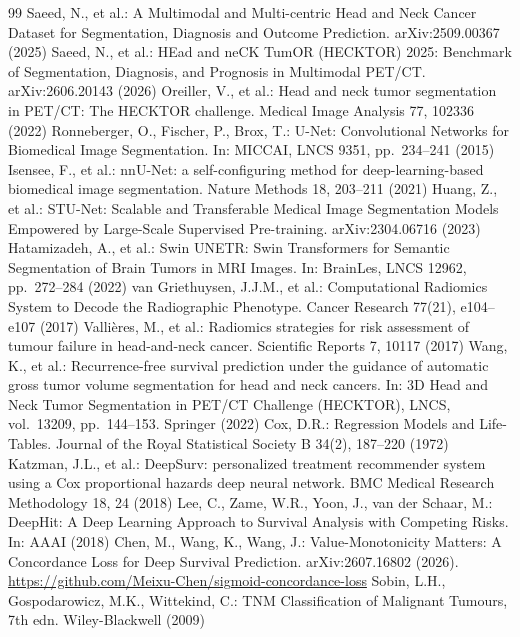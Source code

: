 \documentclass[runningheads]{llncs}
\begin{document}
\begin{thebibliography}{99}
\footnotesize
\linespread{0.85}\selectfont
\setlength{\itemsep}{-1pt}
 Saeed, N., et al.: A Multimodal and Multi-centric Head and Neck Cancer Dataset for Segmentation, Diagnosis and Outcome Prediction. arXiv:2509.00367 (2025)
 Saeed, N., et al.: HEad and neCK TumOR (HECKTOR) 2025: Benchmark of Segmentation, Diagnosis, and Prognosis in Multimodal PET/CT. arXiv:2606.20143 (2026)
 Oreiller, V., et al.: Head and neck tumor segmentation in PET/CT: The HECKTOR challenge. Medical Image Analysis 77, 102336 (2022)
 Ronneberger, O., Fischer, P., Brox, T.: U-Net: Convolutional Networks for Biomedical Image Segmentation. In: MICCAI, LNCS 9351, pp.\ 234--241 (2015)
 Isensee, F., et al.: nnU-Net: a self-configuring method for deep-learning-based biomedical image segmentation. Nature Methods 18, 203--211 (2021)
 Huang, Z., et al.: STU-Net: Scalable and Transferable Medical Image Segmentation Models Empowered by Large-Scale Supervised Pre-training. arXiv:2304.06716 (2023)
 Hatamizadeh, A., et al.: Swin UNETR: Swin Transformers for Semantic Segmentation of Brain Tumors in MRI Images. In: BrainLes, LNCS 12962, pp.\ 272--284 (2022)
 van Griethuysen, J.J.M., et al.: Computational Radiomics System to Decode the Radiographic Phenotype. Cancer Research 77(21), e104--e107 (2017)
 Valli\`eres, M., et al.: Radiomics strategies for risk assessment of tumour failure in head-and-neck cancer. Scientific Reports 7, 10117 (2017)
 Wang, K., et al.: Recurrence-free survival prediction under the guidance of automatic gross tumor volume segmentation for head and neck cancers. In: 3D Head and Neck Tumor Segmentation in PET/CT Challenge (HECKTOR), LNCS, vol.\ 13209, pp.\ 144--153. Springer (2022)
 Cox, D.R.: Regression Models and Life-Tables. Journal of the Royal Statistical Society B 34(2), 187--220 (1972)
 Katzman, J.L., et al.: DeepSurv: personalized treatment recommender system using a Cox proportional hazards deep neural network. BMC Medical Research Methodology 18, 24 (2018)
 Lee, C., Zame, W.R., Yoon, J., van der Schaar, M.: DeepHit: A Deep Learning Approach to Survival Analysis with Competing Risks. In: AAAI (2018)
 Chen, M., Wang, K., Wang, J.: Value-Monotonicity Matters: A Concordance Loss for Deep Survival Prediction. arXiv:2607.16802 (2026). \url{https://github.com/Meixu-Chen/sigmoid-concordance-loss}
 Sobin, L.H., Gospodarowicz, M.K., Wittekind, C.: TNM Classification of Malignant Tumours, 7th edn. Wiley-Blackwell (2009)

\end{thebibliography}
\end{document}
